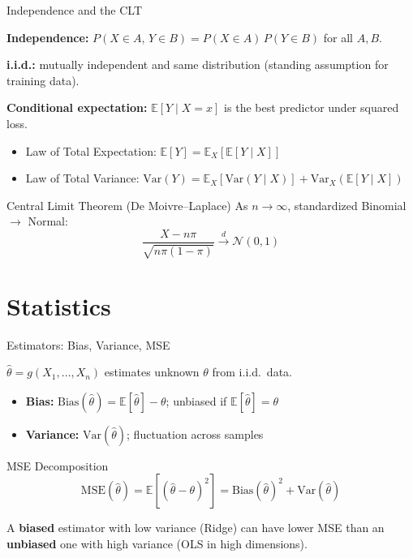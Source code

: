 \documentclass[aspectratio=169, professionalfonts]{beamer}
\def\E{\mathbb{E}}
\def\Var{\text{Var}}
\def\Bias{\text{Bias}}
\def\MSE{\text{MSE}}
\begin{document}
\begin{frame}{Independence and the CLT}

\textbf{Independence:} $P(X \in A,\, Y \in B) = P(X \in A)\,P(Y \in B)$ for all $A, B$.

\textbf{i.i.d.:} mutually independent and same distribution (standing assumption for training data).

\bigskip

\textbf{Conditional expectation:} $\E[Y \mid X = x]$ is the best predictor under squared loss.

\begin{itemize}
  \item Law of Total Expectation: $\E[Y] = \E_X[\E[Y \mid X]]$
  \item Law of Total Variance: $\Var(Y) = \E_X[\Var(Y \mid X)] + \Var_X(\E[Y \mid X])$
\end{itemize}

\bigskip

\begin{block}{Central Limit Theorem (De Moivre--Laplace)}
As $n \to \infty$, standardized Binomial $\to$ Normal:
$$\frac{X - n\pi}{\sqrt{n\pi(1-\pi)}} \xrightarrow{d} \mathcal{N}(0, 1)$$
\end{block}

\end{frame}

\section{Statistics}

\begin{frame}{Estimators: Bias, Variance, MSE}

$\hat{\theta} = g(X_1, \ldots, X_n)$ estimates unknown $\theta$ from i.i.d.\ data.

\bigskip

\begin{itemize}
  \item \textbf{Bias:} $\Bias(\hat{\theta}) = \E[\hat{\theta}] - \theta$; unbiased if $\E[\hat{\theta}] = \theta$
  \item \textbf{Variance:} $\Var(\hat{\theta})$; fluctuation across samples
\end{itemize}

\bigskip

\begin{block}{MSE Decomposition}
$$\MSE(\hat{\theta}) = \E[(\hat{\theta} - \theta)^2] = \Bias(\hat{\theta})^2 + \Var(\hat{\theta})$$
\end{block}

\bigskip

A \textbf{biased} estimator with low variance (Ridge) can have lower MSE than an \textbf{unbiased} one with high variance (OLS in high dimensions).

\end{frame}
\end{document}
